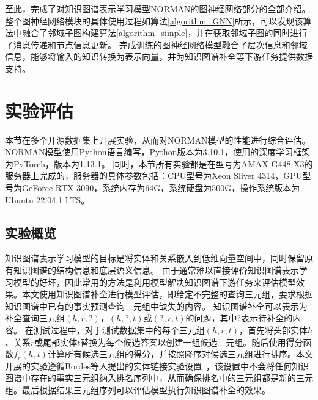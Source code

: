 \documentclass[algorithmlist, AutoFakeBold, AutoFakeSlant, figurelist, tablelist, nomlist, engineering]{seuthesix}
\begin{document}
至此，完成了对知识图谱表示学习模型NORMAN的图神经网络部分的全部介绍。
整个图神经网络模块的具体使用过程如算法\ref{algorithm_GNN}所示，可以发现该算法中融合了邻域子图构建算法\ref{algorithm_simple}，并在获取邻域子图的同时进行了消息传递和节点信息更新。
完成训练的图神经网络模型融合了层次信息和邻域信息，能够将输入的知识转换为表示向量，并为知识图谱补全等下游任务提供数据支持。


\section{实验评估}
本节在多个开源数据集上开展实验，从而对NORMAN模型的性能进行综合评估。
NORMAN模型使用Python语言编写，Python版本为3.10.1，使用的深度学习框架为PyTorch，版本为1.13.1。
同时，本节所有实验都是在型号为AMAX G448-X3的服务器上完成的，服务器的具体参数包括：CPU型号为Xeon Sliver 4314，GPU型号为GeForce RTX 3090，系统内存为64G，系统硬盘为500G，操作系统版本为Ubuntu 22.04.1 LTS。

\subsection{实验概览}
知识图谱表示学习模型的目标是将实体和关系嵌入到低维向量空间中，同时保留原有知识图谱的结构信息和底层语义信息。
由于通常难以直接评价知识图谱表示学习模型的好坏，因此常用的方法是利用模型解决知识图谱下游任务来评估模型效果。本文使用知识图谱补全进行模型评估，即给定不完整的查询三元组，要求根据知识图谱中已有的事实预测查询三元组中缺失的内容。
知识图谱补全可以表示为补全查询三元组$\left(h, r, ?\right)$，$(h, ?, t)$或$\left(?, r, t\right)$的问题，其中$?$表示待补全的内容。
在测试过程中，对于测试数据集中的每个三元组$(h, r, t)$，首先将头部实体$h$、关系$r$或尾部实体$t$替换为每个候选答案以创建一组候选三元组。随后使用得分函数$f_r\left(h, t\right)$计算所有候选三元组的得分，并按照降序对候选三元组进行排序。本文开展的实验遵循Bordes等人提出的实体链接实验设置~\cite{bordes2013translating}，该设置中不会将任何知识图谱中存在的事实三元组纳入排名序列中，从而确保排名中的三元组都是新的三元组。最后根据结果三元组序列可以评估模型执行知识图谱补全的效果。
\end{document}
